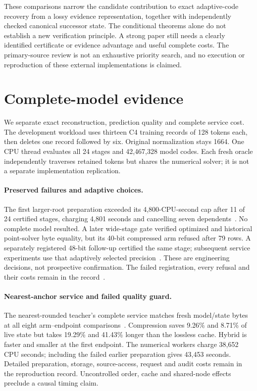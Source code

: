 \documentclass[10pt,twocolumn,letterpaper]{article}
\begin{document}
These comparisons narrow the candidate contribution to exact adaptive-code
recovery from a lossy evidence representation, together with independently
checked canonical successor state. The conditional theorems alone do not
establish a new verification principle. A strong paper still needs a clearly
identified certificate or evidence advantage and useful complete costs. The
primary-source review is not an exhaustive priority search, and no execution or
reproduction of these external implementations is claimed.

\section{Complete-model evidence}
We separate exact reconstruction, prediction quality and complete service cost.
The development workload uses thirteen C4 training records of 128 tokens each,
then deletes one record followed by six. Original normalization stays 1664.
One CPU thread evaluates all 24 stages and 42,467,328 model codes. Each fresh
oracle independently traverses retained tokens but shares the numerical solver;
it is not a separate implementation replication.

\paragraph{Preserved failures and adaptive choices.}
The first larger-root preparation exceeded its 4,800-CPU-second cap after
11 of 24 certified stages, charging 4,801 seconds and cancelling seven
dependents~\cite{v49failure}. No complete model resulted. A later wide-stage
gate verified optimized and historical point-solver byte equality, but its
40-bit compressed arm refused after 79 rows. A separately registered 48-bit
follow-up certified the same stage; subsequent service experiments use that
adaptively selected precision~\cite{v51,v52}. These are engineering decisions,
not prospective confirmation. The failed registration, every refusal and their
costs remain in the record~\cite{v54,v58terminal}.

\paragraph{Nearest-anchor service and failed quality guard.}
The nearest-rounded teacher's complete service matches fresh model/state bytes
at all eight arm--endpoint comparisons~\cite{v58terminal}. Compression saves
9.26\% and 8.71\% of live state but takes 19.29\% and 41.43\% longer than the
lossless cache. Hybrid is faster and smaller at the first endpoint. The
numerical workers charge 38,652 CPU seconds; including the failed earlier
preparation gives 43,453 seconds. Detailed preparation, storage, source-access,
request and audit costs remain in the reproduction record. Uncontrolled order,
cache and shared-node effects preclude a causal timing claim.
\end{document}
